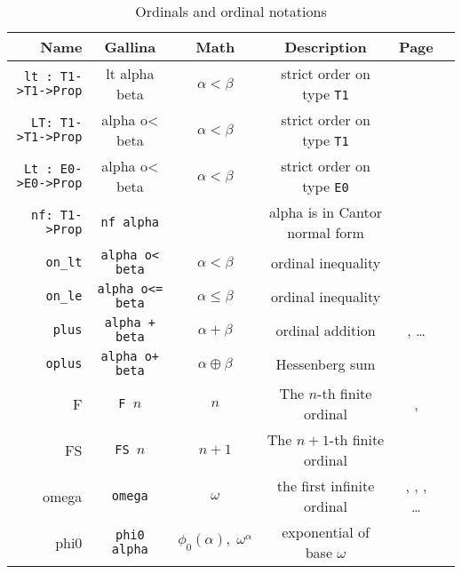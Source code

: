 \documentclass[a4paper]{book}
\begin{document}
\begin{table}[H]
  \centering
  \begin{threeparttable}
    \caption{Ordinals and ordinal notations}
\begin{tabular}{|r | c|c|c|c|l|}
\hline
Name & Gallina&Math& Description& Page \\\hline
\texttt{lt : T1->T1->Prop}& lt alpha beta & $\alpha < \beta$& strict order on type \texttt{T1} \tnote{1} & \pageref{Predicates:lt-T1}\\
\texttt{LT: T1->T1->Prop}& alpha o< beta & $\alpha < \beta$& strict order on type \texttt{T1}   \tnote{2} & \pageref{Predicates:LT-T1}\\
\texttt{Lt : E0->E0->Prop} & alpha o< beta & $\alpha < \beta$& strict order on type \texttt{E0} \tnote{3} & \pageref{Predicates:Lt-E0} \\
\texttt{nf: T1->Prop} & \texttt{nf alpha} && alpha is in Cantor normal form & \pageref{Predicates:nf-T1}\\
 \texttt{on\_lt} & \texttt{alpha o< beta}&$\alpha<\beta$& ordinal inequality \tnote{4} & \pageref{sect:on-lt-notation}\\
 \texttt{on\_le} & \texttt{alpha o<= beta}&$\alpha\leq\beta$& ordinal inequality & \pageref{sect:on-lt-notation}\\
\texttt{plus} & \texttt{alpha + beta} & $\alpha + \beta$ & ordinal addition & \pageref{sect:infix-plus-T1}, \dots\\
\texttt{oplus} & \texttt{alpha o+ beta} & $\alpha \oplus \beta$ & Hessenberg sum & \pageref{sect:infix-oplus} \\

F & \texttt{F $n$} & $n$ & The $n$-th finite ordinal &  
\pageref{sect:notation-F}, \pageref{sect:notation-F-sch}\\ 
FS & \texttt{FS $n$} & $n+1$ & The $n+1$-th finite ordinal  \tnote{5} &  
\pageref{sect:notation-FS}\\ 
omega & \texttt{omega} & $\omega$ &   the first infinite ordinal   & \pageref{sect:notation-omega}, \pageref{sect:omega-T1}, \pageref{sect:omega-notation2}, \dots\\
phi0     & \texttt{phi0 alpha} & $\phi_0(\alpha),\; \omega^\alpha$&exponential of base $\omega$ & \pageref{sect:notation-phi0}\\


\end{tabular}
\end{threeparttable}
\end{table}
\end{document}
